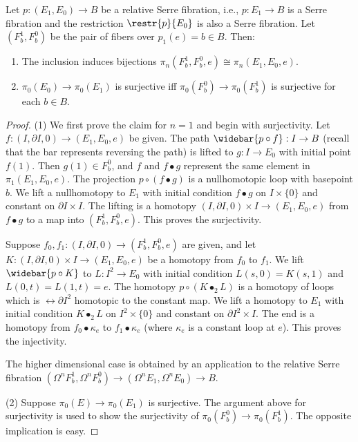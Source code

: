 \begin{prop}\label{prop 6.3.8 tomDieck}
    Let $p:(E_1,E_0)\to B$ be a relative Serre fibration, i.e., $p:E_1\to B$ is a Serre fibration and the restriction $\restr{p}{E_0}$ is also a Serre fibration. Let $(F^1_b,F^0_b)$ be the pair of fibers over $p_1(e)=b\in B$. Then:
    \begin{enumerate}
        \item The inclusion induces bijections $\pi_n(F_b^1,F_b^0,e)\cong\pi_n(E_1,E_0,e)$.
        \item $\pi_0(E_0)\to \pi_0(E_1)$ is surjective iff $\pi_0(F_b^0)\to \pi_0(F_b^1)$ is surjective for each $b\in B$.
    \end{enumerate}
\end{prop}
\begin{proof}
    (1) We first prove the claim for $n=1$ and begin with surjectivity. Let $f:(I,\partial I,0)\to (E_1,E_0,e)$ be given. The path $\widebar{p\circ f}:I\to B$ (recall that the bar represents reversing the path) is lifted to $g:I\to E_0$ with initial point $f(1)$. Then $g(1)\in F^0_b$, and $f$ and $f\bullet g$ represent the same element in $\pi_1(E_1,E_0,e)$. The projection $p\circ(f\bullet g)$ is a nullhomotopic loop with basepoint $b$. We lift a nullhomotopy to $E_1$ with initial condition $f\bullet g$ on $I\times\{0\}$ and constant on $\partial I\times I$. The lifting is a homotopy $(I,\partial I,0)\times I\to (E_1,E_0,e)$ from $f\bullet g$ to a map into $(F^1_b,F^0_b,e)$. This proves the surjectivity.

    Suppose $f_0,f_1:(I,\partial I,0)\to (F^1_b,F^0_b,e)$ are given, and let $K:(I,\partial I,0)\times I\to (E_1,E_0,e)$ be a homotopy from $f_0$ to $f_1$. We lift $\widebar{p\circ K}$ to $L:I^2\to E_0$ with initial condition $L(s,0)=K(s,1)$ and $L(0,t)=L(1,t)=e$. The homotopy $p\circ(K\bullet_2 L)$ is a homotopy of loops which is $\rel \partial I^2$ homotopic to the constant map. We lift a homotopy to $E_1$ with initial condition $K\bullet_2 L$ on $I^2\times\{0\}$ and constant on $\partial I^2\times I$. The end is a homotopy from $f_0\bullet \kappa_e$ to $f_1\bullet\kappa_e$ (where $\kappa_e$ is a constant loop at $e$). This proves the injectivity.

    The higher dimensional case is obtained by an application to the relative Serre fibration $(\Omega^n F^1_b,\Omega^n F^0_b)\to (\Omega^n E_1,\Omega^nE_0)\to B$.

    (2) Suppose $\pi_0(E)\to \pi_0(E_1)$ is surjective. The argument above for surjectivity is used to show the surjectivity of $\pi_0(F^0_b)\to \pi_0(F^1_b)$. The opposite implication is easy.
\end{proof}





